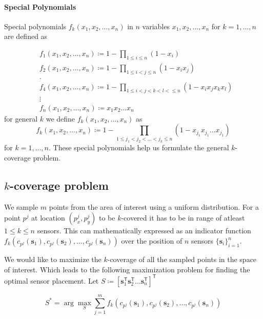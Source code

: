 \documentclass{article}
\def \T {{\mathsf{T}}}
\def \s {{\mathbf{s}}}
\begin{document}
\paragraph{Special Polynomials}
Special polynomials $f_k(x_1,x_2,\dots,x_n)$ in $n$ variables $x_1,x_2,\dots,x_n$ for $k=1,\dots,n$ are defined as

\begin{equation}
	\begin{aligned}
		& f_1(x_1,x_2,\dots,x_n) \coloneqq 1-\prod_{1\leq i\leq n} (1 - x_i) \\
		& f_2(x_1,x_2,\dots,x_n) \coloneqq 1-\prod_{1\leq i < j \leq n} (1 - x_ix_j) \\
		& . \\
		& f_4(x_1,x_2,\dots,x_n) \coloneqq 1-\prod_{1\leq i < j < k < l <\leq n} (1 - x_i x_j x_k x_l) \\
		& \vdots \\
		& f_n(x_1,x_2,\dots,x_n) \coloneqq x_1 x_2 \dots x_n
	\end{aligned}
\end{equation}
for general $k$ we define $f_k(x_1,x_2,\dots,x_n)$ as
\begin{equation}
	f_k(x_1,x_2,\dots,x_n) \coloneqq 1 - \prod_{1\leq j_1 < j_2 < \dots < j_k \leq n} (1 - x_{j_1} x_{j_1} \dots x_{j_1})
\end{equation}
for $k=1,\dots,n$. These special polynomials help us formulate the general $k$-coverage problem.

\subsection{$k$-coverage problem}
We sample $m$ points from the area of interest using a uniform distribution. For a point $p^j$ at location $(p^j_x,p^j_y)$ to be $k$-covered it has to be in range of atleast $1\leq k\leq n$ sensors. This can mathematically expressed as an indicator function $f_k(c_{p^j}(\s_1),c_{p^j}(\s_2),\dots,c_{p^j}(\s_n))$ over the position of $n$ sensors $\{\s_i\}_{i=1}^n$. 

We would like to maximize the $k$-coverage of all the sampled points in the space of interest. Which leads to the following maximization problem for finding the optimal sensor placement. Let $S \coloneqq [\s_1^\T \s_2^\T \dots \s_n^\T]^\T$

\begin{equation}\label{kcov}
	S^* = \arg \max_{S} \sum_{j=1}^{m} f_k(c_{p^j}(\s_1),c_{p^j}(\s_2),\dots,c_{p^j}(\s_n))
\end{equation}
\end{document}
